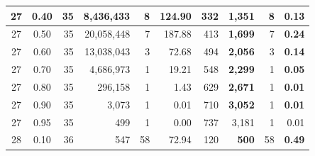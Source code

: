 \begin{table}[H]
\begin{tabular}{|c|c|r|r|r|r|r|r|r|r|}
        27                              & 0.40                               & 35                                              & 8,436,433                                          & 8             & 124.90        & 332           & \textbf{1,351}   & 8             & \textbf{0.13} \\ \hline
        27                              & 0.50                               & 35                                              & 20,058,448                                         & 7             & 187.88        & 413           & \textbf{1,699}   & 7             & \textbf{0.24} \\ \hline
        27                              & 0.60                               & 35                                              & 13,038,043                                         & 3             & 72.68         & 494           & \textbf{2,056}   & 3             & \textbf{0.14} \\ \hline
        27                              & 0.70                               & 35                                              & 4,686,973                                          & 1             & 19.21         & 548           & \textbf{2,299}   & 1             & \textbf{0.05} \\ \hline
        27                              & 0.80                               & 35                                              & 296,158                                            & 1             & 1.43          & 629           & \textbf{2,671}   & 1             & \textbf{0.01} \\ \hline
        27                              & 0.90                               & 35                                              & 3,073                                              & 1             & 0.01          & 710           & \textbf{3,052}   & 1             & \textbf{0.01} \\ \hline
        27                              & 0.95                               & 35                                              & 499                                                & 1             & 0.00          & 737           & 3,181            & 1             & 0.01          \\ \hline
        28                              & 0.10                               & 36                                              & 547                                                & 58            & 72.94         & 120           & \textbf{ 500}    & 58            & \textbf{0.49} \\ \hline

\end{tabular}
\end{table}
